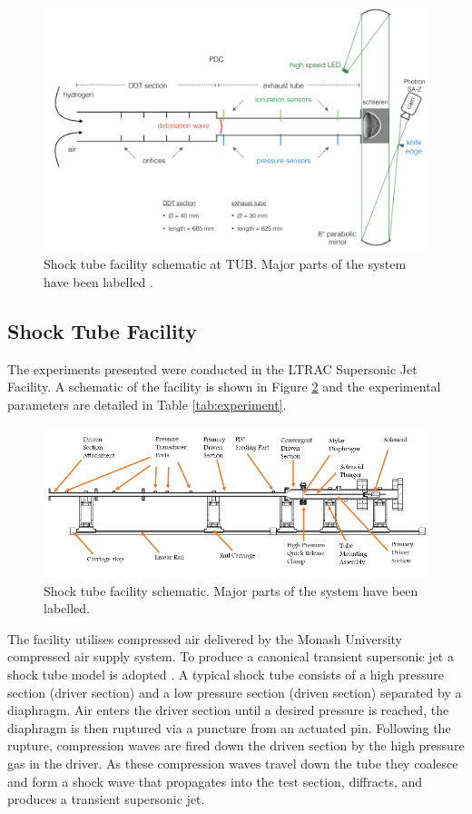 \begin{figure}[H] 
	\centering
	\includegraphics[width=1\textwidth]{berlin.PNG} 
	\caption{Shock tube facility schematic at TUB. Major parts of the
		system have been labelled \citep{bhavberlin}.}
	\label{fig:berlin}
\end{figure}
\newpage
\subsection{Shock Tube Facility}
The experiments presented were conducted in the LTRAC Supersonic Jet Facility. A schematic of the facility is shown in Figure \ref{fig:shocktube} and the experimental parameters are detailed in Table \ref{tab:experiment}. 

\begin{figure}[H] 
	\centering
	\includegraphics[width=1\textwidth]{fig9.PNG} 
	\caption{Shock tube facility schematic. Major parts of the
		system have been labelled.}
	\label{fig:shocktube}
\end{figure}	

The facility utilises compressed air delivered by the Monash University compressed air supply system. To produce a canonical transient supersonic jet a shock tube model is adopted \citep{john1962shock}. A typical shock tube consists of a high pressure section (driver section) and a low pressure section (driven section) separated by a diaphragm. Air enters the driver section until a desired pressure is reached, the diaphragm is then ruptured via a puncture from an actuated pin. Following the rupture, compression waves are fired down the driven section by the high pressure gas in the driver. As these compression waves travel down the tube they coalesce and form a shock wave that propagates into the test section, diffracts, and produces a transient supersonic jet. 

